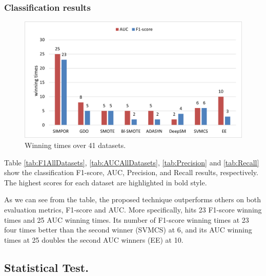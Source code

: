 \subsubsection{Classification results}
\label{sec:classificationResult}




\begin{figure}[h!]
	\centering
	\includegraphics[width=\linewidth ]{Figures/winning_times}
	\caption{Winning times over 41 datasets.}
	\label{fig:winingTimes}
\end{figure}

Table \ref{tab:F1AllDatasets}, \ref{tab:AUCAllDatasets}, \ref{tab:Precision} and \ref{tab:Recall} show the classification F1-score, AUC, Precision, and Recall results, respectively. The highest scores for each dataset are highlighted in bold style. 

As we can see from the table, the proposed technique outperforms others on both evaluation metrics, F1-score and AUC. More specifically, \Methodname{} hits 23 F1-score winning times and 25 AUC winning times. Its number of F1-score winning times at 23 four times better than the second winner (SVMCS) at 6, and its AUC winning times at 25 doubles the second AUC winners (EE) at 10. 


\subsection{Statistical Test.}
	\label{sec:wilcoxon}

